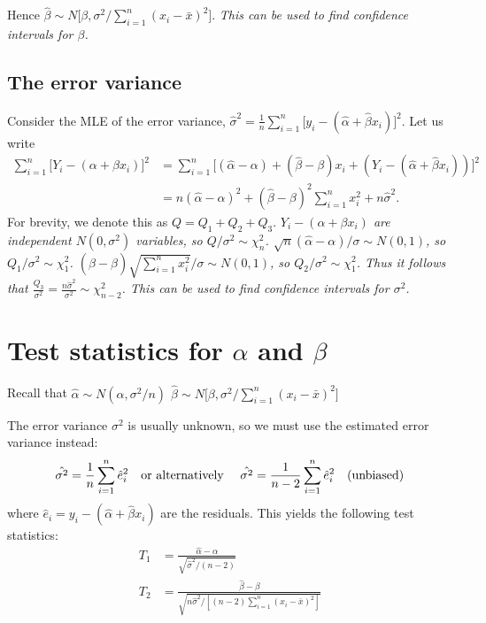 Hence $\hat{\beta}\sim N\Big[\beta,\sigma^2 / \sum_{i=1}^n(x_i-\bar{x})^2\Big]$.
\bit
\it This can be used to find confidence intervals for $\beta$.
\eit


\subsection{The error variance}
Consider the MLE of the error variance, $\hat{\sigma}^2 = \displaystyle\frac{1}{n}\sum_{i=1}^n \big[y_i-(\hat{\alpha}+\hat{\beta} x_i)\big]^2$.
Let us write
\begin{align*}
\sum_{i=1}^n\big[Y_i-(\alpha+\beta x_i)\big]^2
	& = \sum_{i=1}^n\big[(\hat{\alpha}-\alpha) + (\hat{\beta}-\beta)x_i + (Y_i-(\hat{\alpha}+\hat{\beta}x_i))\big]^2 \\
	& = n(\hat{\alpha}-\alpha)^2 + (\hat{\beta}-\beta)^2\sum_{i=1}^n x_i^2 + n\hat{\sigma}^2.
\end{align*}
For brevity, we denote this as $Q=Q_1+Q_2+Q_3$.
\bit
\it $Y_i-(\alpha+\beta x_i)$ are independent $N(0,\sigma^2)$ variables, so $Q/\sigma^2\sim\chi^2_{n}$.
\it $\sqrt{n}(\hat{\alpha}-\alpha)/\sigma \sim N(0,1)$, so $Q_1/\sigma^2 \sim \chi^2_1$.
\it $(\hat{\beta}-\beta)\sqrt{\sum_{i=1}^n x_i^2}/\sigma \sim N(0,1)$, so $Q_2/\sigma^2 \sim \chi^2_1$.
\eit
Thus it follows that $\displaystyle \frac{Q_3}{\sigma^2} = \frac{n\hat{\sigma}^2}{\sigma^2} \sim\chi^2_{n-2}$.
\bit
\it This can be used to find confidence intervals for $\sigma^2$.
\eit



\section{Test statistics for $\alpha$ and $\beta$}

Recall that
\bit
\it $\hat{\alpha} \sim N(\alpha,\sigma^2/n)$
\it $\hat{\beta}\sim N\Big[\beta,\sigma^2 / \sum_{i=1}^n(x_i-\bar{x})^2\Big]$
\eit

The error variance $\sigma^2$ is usually unknown, so we must use the estimated error variance instead:
\[
\hat{\sigma^2} = \frac{1}{n}\sum_{i=1}^n \hat{e}_i^2 
\text{\quad or alternatively \quad} 
\hat{\sigma^2} = \frac{1}{n-2}\sum_{i=1}^n \hat{e}_i^2 \text{\quad (unbiased)}
\]
where $\hat{e}_i = y_i-(\hat{\alpha}+\hat{\beta} x_i)$ are the residuals.
%
This yields the following test statistics:
\begin{align*}
T_1 & = \frac{\hat{\alpha}-\alpha}{\sqrt{\hat{\sigma}^2/(n-2)}} \\[2ex]
T_2 & = \frac{\hat{\beta}-\beta}{\sqrt{n\hat{\sigma}^2/[(n-2)\sum_{i=1}^n(x_i-\bar{x})^2]}}
\end{align*}



